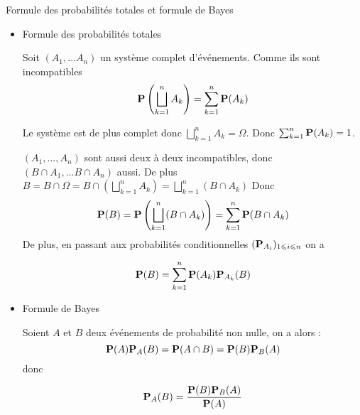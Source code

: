 \documentclass{article}
\renewenvironment{question_kholle}[2][ ]
{
	\subsection{\texorpdfstring{#2}{}}
	\notblank{#1}
	{
		\noindent #1
		\bigbreak
	}
	{}
	\begin{proof}
}
{
	\end{proof}
}
\begin{document}
\begin{question_kholle}{Formule des probabilités totales et formule de Bayes}
	\begin{itemize}
		\item Formule des probabilités totales
		
		Soit $(A_{1}, \dots A_{n})$ un système complet d'événements.
		Comme ils sont incompatibles
		$$\mathbf P\left( \bigsqcup_{k=1}^{n} A_{k} \right)= \sum_{k=1}^{n}\mathbf P(A_{k})$$
		
		Le système est de plus complet donc $\bigsqcup _{k=1}^{n} A_{k} = \Omega$. Donc $\sum_{k=1}^{n}\mathbf P(A_{k}) = 1$.
		
		$(A_{1}, \dots , A_{n})$ sont aussi deux à deux incompatibles, donc $(B \cap A_{1}, \dots B \cap A_{n})$ aussi.
		De plus $B = B \cap \Omega = B \cap \left( \bigsqcup_{k=1}^{n}A_{k} \right) = \bigsqcup_{k=1}^{n}(B \cap A_{k})$
		Donc
		$$\mathbf P(B)= \mathbf P\left( \bigsqcup_{k=1}^{n}(B \cap A_{k}) \right) = \sum_{k=1}^{n}\mathbf P(B \cap A_{k})$$
		De plus, en passant aux probabilités conditionnelles $(\mathbf P_{A_{i}})_{1\leqslant i\leqslant n}$ on a 
		
		$$\mathbf P(B) = \sum_{k=1}^{n}\mathbf P(A_{k})\mathbf P_{A_{k}}(B)$$
		
		\item Formule de Bayes
		
		Soient $A$ et $B$ deux événements de probabilité non nulle, on a alors :
		$$\mathbf P(A)\mathbf P_{A}(B) = \mathbf P(A \cap B) = \mathbf P(B)\mathbf P_{B}(A)$$
		donc
		
		$$\mathbf P_{A}(B) = \frac{\mathbf P(B)\mathbf P_{B}(A)}{\mathbf P(A)}$$
	\end{itemize}
\end{question_kholle}
\end{document}
